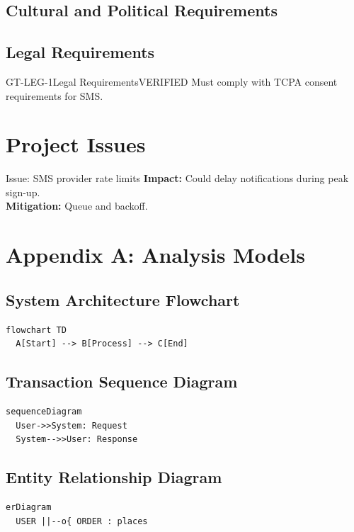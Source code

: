 \documentclass[11pt,a4paper]{article}
\begin{document}
\subsection{Cultural and Political Requirements}
\subsection{Legal Requirements}
\begin{requirementbox}{GT-LEG-1}{Legal Requirements}{VERIFIED}
Must comply with TCPA consent requirements for SMS.
\end{requirementbox}

\section{Project Issues}
\begin{warningbox}{Issue: SMS provider rate limits}
\textbf{Impact:} Could delay notifications during peak sign-up.\\
\textbf{Mitigation:} Queue and backoff.\\
\end{warningbox}

\section{Appendix A: Analysis Models}
\subsection{System Architecture Flowchart}
\begin{lstlisting}[language={},caption={Flowchart Model (Mermaid Source)}]
flowchart TD
  A[Start] --> B[Process] --> C[End]
\end{lstlisting}

\subsection{Transaction Sequence Diagram}
\begin{lstlisting}[language={},caption={Sequence Model (Mermaid Source)}]
sequenceDiagram
  User->>System: Request
  System-->>User: Response
\end{lstlisting}

\subsection{Entity Relationship Diagram}
\begin{lstlisting}[language={},caption={Entity Relationship Model (Mermaid Source)}]
erDiagram
  USER ||--o{ ORDER : places
\end{lstlisting}
\end{document}
